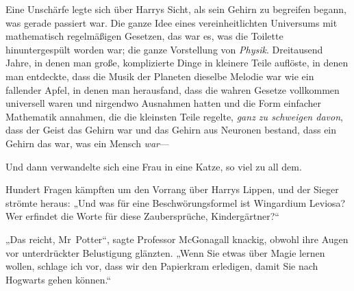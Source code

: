 Eine Unschärfe legte sich über Harrys Sicht, als sein Gehirn zu begreifen begann, was gerade passiert war. Die ganze Idee eines vereinheitlichten Universums mit mathematisch regelmäßigen Gesetzen, das war es, was die Toilette hinuntergespült worden war; die ganze Vorstellung von \emph{Physik}. Dreitausend Jahre, in denen man große, komplizierte Dinge in kleinere Teile auflöste, in denen man entdeckte, dass die Musik der Planeten dieselbe Melodie war wie ein fallender Apfel, in denen man herausfand, dass die wahren Gesetze vollkommen universell waren und nirgendwo Ausnahmen hatten und die Form einfacher Mathematik annahmen, die die kleinsten Teile regelte, \emph{ganz zu schweigen davon}, dass der Geist das Gehirn war und das Gehirn aus Neuronen bestand, dass ein Gehirn das war, was ein Mensch \emph{war}—

Und dann verwandelte sich eine Frau in eine Katze, so viel zu all dem.

Hundert Fragen kämpften um den Vorrang über Harrys Lippen, und der Sieger strömte heraus: „Und was für eine Beschwörungsformel ist Wingardium Leviosa? Wer erfindet die Worte für diese Zaubersprüche, Kindergärtner?“

„Das reicht, Mr~Potter“, sagte Professor McGonagall knackig, obwohl ihre Augen vor unterdrückter Belustigung glänzten. „Wenn Sie etwas über Magie lernen wollen, schlage ich vor, dass wir den Papierkram erledigen, damit Sie nach Hogwarts gehen können.“

